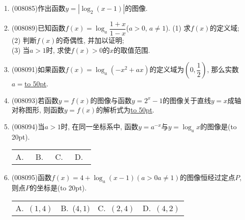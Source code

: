 \documentclass[10pt,a4paper]{article}
\newcommand{\blank}[1]{\underline{\hbox to #1pt{}}}
\newcommand{\bracket}[1]{(\hbox to #1pt{})}
\newcommand{\fourch}[4]{\par\begin{tabular}{p{.23\textwidth}p{.23\textwidth}p{.23\textwidth}p{.23\textwidth}}
A.~#1 &B.~#2& C.~#3& D.~#4
\end{tabular}}
\begin{document}
\begin{enumerate}[1.]
\item {\tiny (008085)}作出函数$y=|\log _2(x-1)|$的图像.
\item {\tiny (008089)}已知函数$f(x)=\log _a\dfrac{1+x}{1-x}$($a>0$, $a\ne 1$).
(1) 求$f(x)$的定义域;\\
(2) 判断$f(x)$的奇偶性, 并加以证明;\\
(3) 当$a>1$时, 求使$f(x)>0$的$x$的取值范围.
\item {\tiny (008091)}如果函数$f(x)=\log _a(-x^2+ax)$的定义域为$(0,\dfrac 12)$, 那么实数$a=$\blank{50}.
\item {\tiny (008093)}若函数$y=f(x)$的图像与函数$y=2^x-1$的图像关于直线$y=x$成轴对称图形, 则函数$y=f(x)$的解析式为\blank{50}.
\item {\tiny (008094)}当$a>1$时, 在同一坐标系中, 函数$y=a^{-x}$与$y=\log _ax$的图像是\bracket{20}.
\fourch{\begin{tikzpicture}[scale = 0.7, >=latex]
    \draw [->] (-2,0) -- (2,0) node [below] {$x$};
    \draw [->] (0,-2) -- (0,2) node [left] {$y$};
    \draw (0,0) node [below left] {$O$};
    \draw [domain = -1:2] plot (\x, {pow(0.5,\x)});
    \draw [domain = -1:2] plot ({pow(0.5,\x)},-\x);
\end{tikzpicture}}
{\begin{tikzpicture}[scale = 0.7, >=latex]
    \draw [->] (-2,0) -- (2,0) node [below] {$x$};
    \draw [->] (0,-2) -- (0,2) node [left] {$y$};
    \draw (0,0) node [below left] {$O$};
    \draw [domain = -1:2] plot (-\x, {pow(0.5,\x)});
    \draw [domain = -1:2] plot ({pow(0.5,\x)},-\x);
\end{tikzpicture}}{\begin{tikzpicture}[scale = 0.7, >=latex]
    \draw [->] (-2,0) -- (2,0) node [below] {$x$};
    \draw [->] (0,-2) -- (0,2) node [left] {$y$};
    \draw (0,0) node [below left] {$O$};
    \draw [domain = -1:2] plot (-\x, {pow(0.5,\x)});
    \draw [domain = -1:2] plot ({pow(0.5,\x)},\x);
\end{tikzpicture}}{\begin{tikzpicture}[scale = 0.7, >=latex]
    \draw [->] (-2,0) -- (2,0) node [below] {$x$};
    \draw [->] (0,-2) -- (0,2) node [left] {$y$};
    \draw (0,0) node [below left] {$O$};
    \draw [domain = -1:2] plot (\x, {pow(0.5,\x)});
    \draw [domain = -1:2] plot ({pow(0.5,\x)},\x);
\end{tikzpicture}}
\item {\tiny (008095)}函数$f(x)=4+\log _a(x-1)(a>0a\ne 1)$的图像恒经过定点$P$, 则点$P$的坐标是\bracket{20}.
\fourch{$(1, 4)$}{($4, 1)$}{$(2, 4)$}{$(4, 2)$}

\end{enumerate}
\end{document}
